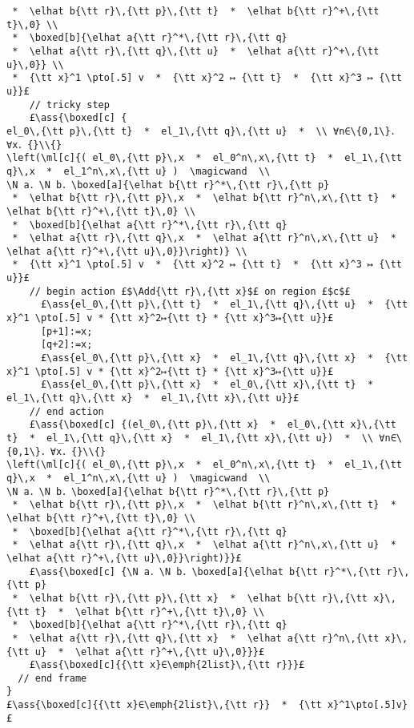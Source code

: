 \documentclass[12pt,a4paper]{article}
\makeatletter
\newcommand{\ml}[2][t]{\mbox{\mdseries\begin{tabular}[#1]{@{}L@{}}#2\end{tabular}}}
\newcommand{\ass}[1]{\ensuremath{{\color{blue}\left\{\ml[c]{#1}\right\}}}}
\makeatother
\begin{document}
\begin{lstlisting}
 *  \elhat b{\tt r}\,{\tt p}\,{\tt t}  *  \elhat b{\tt r}^+\,{\tt t}\,0} \\ 
 *  \boxed[b]{\elhat a{\tt r}^*\,{\tt r}\,{\tt q} 
 *  \elhat a{\tt r}\,{\tt q}\,{\tt u}  *  \elhat a{\tt r}^+\,{\tt u}\,0}} \\ 
 *  {\tt x}^1 \pto[.5] v  *  {\tt x}^2 ↦ {\tt t}  *  {\tt x}^3 ↦ {\tt u}}£
    // tricky step
    £\ass{\boxed[c] {
el_0\,{\tt p}\,{\tt t}  *  el_1\,{\tt q}\,{\tt u}  *  \\ ∀n∈\{0,1\}．∀x．{}\\{}
\left(\ml[c]{( el_0\,{\tt p}\,x  *  el_0^n\,x\,{\tt t}  *  el_1\,{\tt q}\,x  *  el_1^n\,x\,{\tt u} )  \magicwand  \\
\N a．\N b．\boxed[a]{\elhat b{\tt r}^*\,{\tt r}\,{\tt p} 
 *  \elhat b{\tt r}\,{\tt p}\,x  *  \elhat b{\tt r}^n\,x\,{\tt t}  *  \elhat b{\tt r}^+\,{\tt t}\,0} \\ 
 *  \boxed[b]{\elhat a{\tt r}^*\,{\tt r}\,{\tt q} 
 *  \elhat a{\tt r}\,{\tt q}\,x  *  \elhat a{\tt r}^n\,x\,{\tt u}  *  \elhat a{\tt r}^+\,{\tt u}\,0}}\right)} \\
 *  {\tt x}^1 \pto[.5] v  *  {\tt x}^2 ↦ {\tt t}  *  {\tt x}^3 ↦ {\tt u}}£
    // begin action £$\Add{\tt r}\,{\tt x}$£ on region £$c$£
      £\ass{el_0\,{\tt p}\,{\tt t}  *  el_1\,{\tt q}\,{\tt u}  *  {\tt x}^1 \pto[.5] v * {\tt x}^2↦{\tt t} * {\tt x}^3↦{\tt u}}£
      [p+1]:=x;
      [q+2]:=x;
      £\ass{el_0\,{\tt p}\,{\tt x}  *  el_1\,{\tt q}\,{\tt x}  *  {\tt x}^1 \pto[.5] v * {\tt x}^2↦{\tt t} * {\tt x}^3↦{\tt u}}£
      £\ass{el_0\,{\tt p}\,{\tt x}  *  el_0\,{\tt x}\,{\tt t}  *  el_1\,{\tt q}\,{\tt x}  *  el_1\,{\tt x}\,{\tt u}}£
    // end action
    £\ass{\boxed[c] {(el_0\,{\tt p}\,{\tt x}  *  el_0\,{\tt x}\,{\tt t}  *  el_1\,{\tt q}\,{\tt x}  *  el_1\,{\tt x}\,{\tt u})  *  \\ ∀n∈\{0,1\}．∀x．{}\\{}
\left(\ml[c]{( el_0\,{\tt p}\,x  *  el_0^n\,x\,{\tt t}  *  el_1\,{\tt q}\,x  *  el_1^n\,x\,{\tt u} )  \magicwand  \\
\N a．\N b．\boxed[a]{\elhat b{\tt r}^*\,{\tt r}\,{\tt p} 
 *  \elhat b{\tt r}\,{\tt p}\,x  *  \elhat b{\tt r}^n\,x\,{\tt t}  *  \elhat b{\tt r}^+\,{\tt t}\,0} \\ 
 *  \boxed[b]{\elhat a{\tt r}^*\,{\tt r}\,{\tt q} 
 *  \elhat a{\tt r}\,{\tt q}\,x  *  \elhat a{\tt r}^n\,x\,{\tt u}  *  \elhat a{\tt r}^+\,{\tt u}\,0}}\right)}}£
    £\ass{\boxed[c] {\N a．\N b．\boxed[a]{\elhat b{\tt r}^*\,{\tt r}\,{\tt p} 
 *  \elhat b{\tt r}\,{\tt p}\,{\tt x}  *  \elhat b{\tt r}\,{\tt x}\,{\tt t}  *  \elhat b{\tt r}^+\,{\tt t}\,0} \\ 
 *  \boxed[b]{\elhat a{\tt r}^*\,{\tt r}\,{\tt q} 
 *  \elhat a{\tt r}\,{\tt q}\,{\tt x}  *  \elhat a{\tt r}^n\,{\tt x}\,{\tt u}  *  \elhat a{\tt r}^+\,{\tt u}\,0}}}£
    £\ass{\boxed[c]{{\tt x}∈\emph{2list}\,{\tt r}}}£
  // end frame
}
£\ass{\boxed[c]{{\tt x}∈\emph{2list}\,{\tt r}}  *  {\tt x}^1\pto[.5]v}£

\end{lstlisting}
\end{document}
